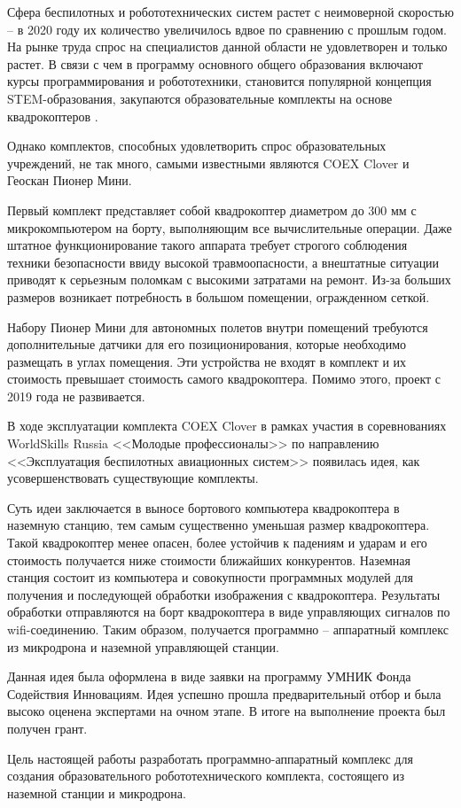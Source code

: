 Сфера беспилотных и робототехнических систем растет с неимоверной скоростью -- в 2020 году их количество увеличилось вдвое по сравнению с прошлым годом. На рынке труда спрос на специалистов данной области не удовлетворен и только растет. В связи с чем в программу основного общего образования включают курсы программирования и робототехники, становится популярной концепция STEM-образования, закупаются образовательные комплекты на основе квадрокоптеров \cite{minobr}.

Однако комплектов, способных удовлетворить спрос образовательных учреждений, не так много, самыми известными являются COEX Clover и Геоскан Пионер Мини.

Первый комплект представляет собой квадрокоптер диаметром до 300 мм с микрокомпьютером на борту, выполняющим все вычислительные операции. Даже штатное функционирование такого аппарата требует строгого соблюдения техники безопасности ввиду высокой травмоопасности, а внештатные ситуации приводят к серьезным поломкам с высокими затратами на ремонт. Из-за больших размеров возникает потребность в большом помещении, огражденном сеткой.

Набору Пионер Мини для автономных полетов внутри помещений требуются дополнительные датчики для его позиционирования, которые необходимо размещать в углах помещения. Эти устройства не входят в комплект и их стоимость превышает стоимость самого квадрокоптера. Помимо этого, проект с 2019 года не развивается.

В ходе эксплуатации комплекта COEX Clover в рамках участия в соревнованиях WorldSkills Russia <<Молодые профессионалы>> по направлению <<Эксплуатация беспилотных авиационных систем>> появилась идея, как усовершенствовать существующие комплекты.

Суть идеи заключается в выносе бортового компьютера квадрокоптера в наземную станцию, тем самым существенно уменьшая размер квадрокоптера. Такой квадрокоптер менее опасен, более устойчив к падениям и ударам и его стоимость получается ниже стоимости ближайших конкурентов. Наземная станция состоит из компьютера и совокупности программных модулей для получения и последующей обработки изображения с квадрокоптера. Результаты обработки отправляются на борт квадрокоптера в виде управляющих сигналов по wifi-соединению. Таким образом, получается программно -- аппаратный комплекс из микродрона и наземной управляющей станции.

Данная идея была оформлена в виде заявки на программу УМНИК Фонда Содействия Инновациям. Идея успешно прошла предварительный отбор \cite{umnik} и была высоко оценена экспертами на очном этапе. В итоге на выполнение проекта был получен грант.

Цель настоящей работы разработать программно-аппаратный комплекс для создания образовательного робототехнического комплекта, состоящего из наземной станции и микродрона.
